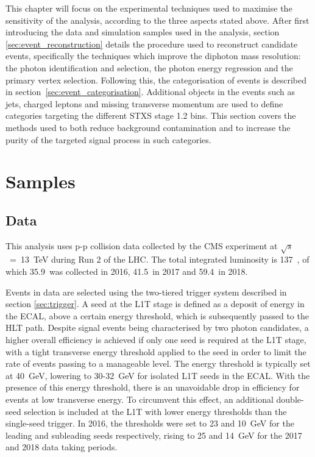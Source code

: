 This chapter will focus on the experimental techniques used to maximise the sensitivity of the analysis, according to the three aspects stated above. After first introducing the data and simulation samples used in the analysis, section \ref{sec:event_reconstruction} details the procedure used to reconstruct candidate \Hgg events, specifically the techniques which improve the diphoton mass resolution: the photon identification and selection, the photon energy regression and the primary vertex selection. Following this, the categorisation of events is described in section~\ref{sec:event_categorisation}. Additional objects in the events such as jets, charged leptons and missing transverse momentum are used to define categories targeting the different STXS stage 1.2 bins. This section covers the methods used to both reduce background contamination and to increase the purity of the targeted signal process in such categories.








\section{Samples}
\subsection{Data}
This analysis uses p-p collision data collected by the CMS experiment at $\sqrt{s}$~=~13~TeV during Run 2 of the LHC. The total integrated luminosity is 137~\fbinv, of which 35.9~\fbinv was collected in 2016, 41.5~\fbinv in 2017 and 59.4~\fbinv in 2018.

Events in data are selected using the two-tiered trigger system described in section \ref{sec:trigger}. A seed at the L1T stage is defined as a deposit of energy in the ECAL, above a certain energy threshold, which is subsequently passed to the HLT path. Despite signal events being characterised by two photon candidates, a higher overall efficiency is achieved if only one seed is required at the L1T stage, with a tight transverse energy threshold applied to the seed in order to limit the rate of events passing to a manageable level. The energy threshold is typically set at 40~GeV, lowering to 30-32~GeV for isolated L1T seeds in the ECAL. With the presence of this energy threshold, there is an unavoidable drop in efficiency for \Hgg events at low transverse energy. To circumvent this effect, an additional double-seed selection is included at the L1T with lower energy thresholds than the single-seed trigger. In 2016, the thresholds were set to 23 and 10~GeV for the leading and subleading seeds respectively, rising to 25 and 14~GeV for the 2017 and 2018 data taking periods.

